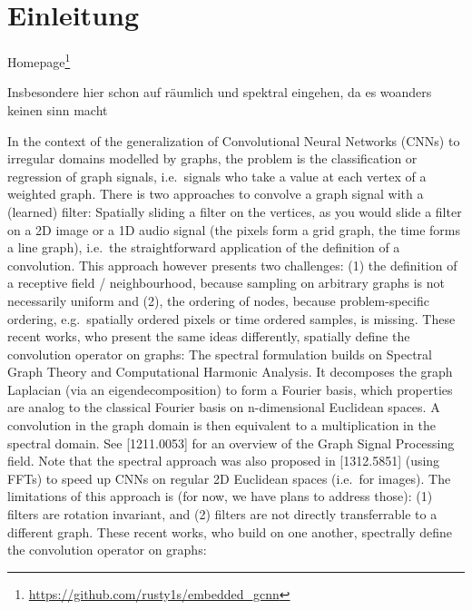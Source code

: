 \chapter{Einleitung}
\label{einleitung}

Homepage\footnote{\url{https://github.com/rusty1s/embedded\_gcnn}}

Insbesondere hier schon auf räumlich und spektral eingehen, da es woanders keinen sinn macht

In the context of the generalization of Convolutional Neural Networks (CNNs) to irregular domains modelled by graphs, the problem is the classification or regression of graph signals, i.e.\ signals who take a value at each vertex of a weighted graph. There is two approaches to convolve a graph signal with a (learned) filter:
Spatially sliding a filter on the vertices, as you would slide a filter on a 2D image or a 1D audio signal (the pixels form a grid graph, the time forms a line graph), i.e.\ the straightforward application of the definition of a convolution. This approach however presents two challenges: (1) the definition of a receptive field / neighbourhood, because sampling on arbitrary graphs is not necessarily uniform and (2), the ordering of nodes, because problem-specific ordering, e.g.\ spatially ordered pixels or time ordered samples, is missing. These recent works, who present the same ideas differently, spatially define the convolution operator on graphs:
The spectral formulation builds on Spectral Graph Theory and Computational Harmonic Analysis. It decomposes the graph Laplacian (via an eigendecomposition) to form a Fourier basis, which properties are analog to the classical Fourier basis on n-dimensional Euclidean spaces. A convolution in the graph domain is then equivalent to a multiplication in the spectral domain. See [1211.0053] for an overview of the Graph Signal Processing field. Note that the spectral approach was also proposed in [1312.5851] (using FFTs) to speed up CNNs on regular 2D Euclidean spaces (i.e.\ for images). The limitations of this approach is (for now, we have plans to address those): (1) filters are rotation invariant, and (2) filters are not directly transferrable to a different graph. These recent works, who build on one another, spectrally define the convolution operator on graphs:




